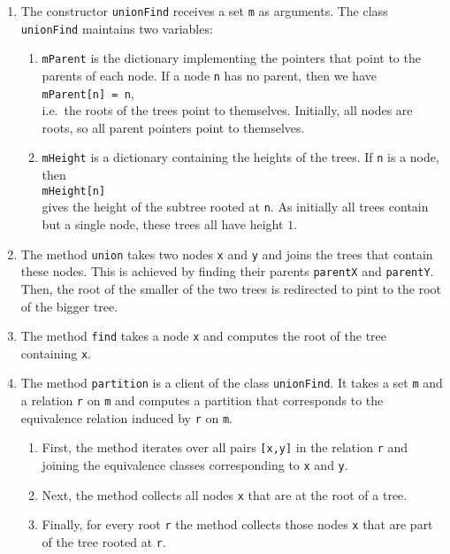 \begin{enumerate}
\item The constructor \texttt{unionFind} receives a set \texttt{m} as arguments.  The class
      \texttt{unionFind} maintains two variables:
      \begin{enumerate}
      \item \texttt{mParent} is the dictionary implementing the pointers that point to the parents
             of each node.  If a node \texttt{n} has no parent, then we have
             \\[0.2cm]
             \hspace*{1.3cm}
             \texttt{mParent[n] = n},
             \\[0.2cm]
             i.e.~the roots of the trees point to themselves.  Initially, all nodes are roots, so
             all parent pointers point to themselves.
      \item \texttt{mHeight} is a dictionary containing the heights of the trees.  If \texttt{n} is
            a node, then
            \\[0.2cm]
            \hspace*{1.3cm}
            \texttt{mHeight[n]}
            \\[0.2cm]
            gives the height of the subtree rooted at \texttt{n}. As initially all trees contain but
            a single node, these trees all have height $1$.
      \end{enumerate}
\item The method \texttt{union} takes two nodes \texttt{x} and \texttt{y} and joins the trees that
      contain these nodes.  This is achieved by finding their parents \texttt{parentX} and
      \texttt{parentY}.  Then, the root of the smaller of the two trees is redirected to pint to
      the root of the bigger tree.
\item The method \texttt{find} takes a node \texttt{x} and computes the root of the tree containing
      \texttt{x}. 
\item The method \texttt{partition} is a client of the class \texttt{unionFind}.  It takes a set
      \texttt{m} and a relation \texttt{r} on \texttt{m} and computes a partition that corresponds
      to the equivalence relation induced by \texttt{r} on \texttt{m}. 
      \begin{enumerate}
      \item First, the method iterates over all pairs \texttt{[x,y]} in the relation \texttt{r} and
            joining the equivalence classes corresponding to \texttt{x} and \texttt{y}.
      \item Next, the method collects all nodes \texttt{x} that are at the root of a tree.
      \item Finally, for every root \texttt{r} the method collects those nodes \texttt{x} that are
            part of the tree rooted at \texttt{r}.
      \end{enumerate}
\end{enumerate}

